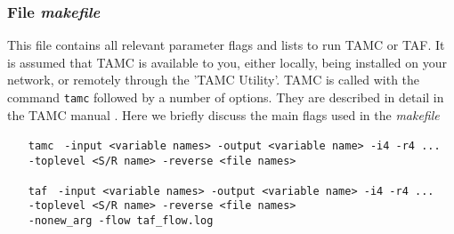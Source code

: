\subsubsection{File {\it makefile}}

This file contains all relevant parameter flags and
lists to run TAMC or TAF.
It is assumed that TAMC is available to you, either locally,
being installed on your network, or remotely through the 'TAMC Utility'.
TAMC is called with the command {\tt tamc} followed by a
number of options. They are described in detail in the
TAMC manual \cite{gie:99}.
Here we briefly discuss the main flags used in the {\it makefile}
%
\begin{itemize}
\item [{\tt tamc}] {\tt
-input <variable names>
-output <variable name> -i4 -r4 ... \\
-toplevel <S/R name> -reverse <file names> 
}
\item [{\tt taf}] {\tt
-input <variable names>
-output <variable name> -i4 -r4 ... \\
-toplevel <S/R name> -reverse <file names> \\
-nonew_arg -flow taf_flow.log
}
\end{itemize}
%

